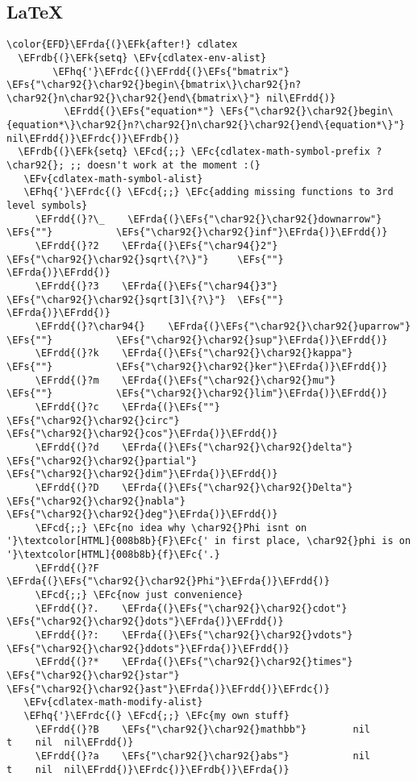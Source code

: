 \documentclass{article}
\newcommand{\EFc}[1]{\textcolor{EFc}{#1}} %
\newcommand{\EFcd}[1]{\textcolor{EFcd}{#1}} %
\newcommand{\EFs}[1]{\textcolor{EFs}{#1}} %
\newcommand{\EFk}[1]{\textcolor{EFk}{#1}} %
\newcommand{\EFv}[1]{\textcolor{EFv}{#1}} %
\newcommand{\EFhq}[1]{#1} %
\newcommand{\EFrda}[1]{\textcolor{EFrda}{#1}} %
\newcommand{\EFrdb}[1]{\textcolor{EFrdb}{#1}} %
\newcommand{\EFrdc}[1]{\textcolor{EFrdc}{#1}} %
\newcommand{\EFrdd}[1]{\textcolor{EFrdd}{#1}} %
\begin{document}
\subsection{\LaTeX{}}
\label{sec:org824c76c}
\begin{Code}
\begin{Verbatim}
\color{EFD}\EFrda{(}\EFk{after!} cdlatex
  \EFrdb{(}\EFk{setq} \EFv{cdlatex-env-alist}
        \EFhq{'}\EFrdc{(}\EFrdd{(}\EFs{"bmatrix"} \EFs{"\char92{}\char92{}begin\{bmatrix\}\char92{}n?\char92{}n\char92{}\char92{}end\{bmatrix\}"} nil\EFrdd{)}
          \EFrdd{(}\EFs{"equation*"} \EFs{"\char92{}\char92{}begin\{equation*\}\char92{}n?\char92{}n\char92{}\char92{}end\{equation*\}"} nil\EFrdd{)}\EFrdc{)}\EFrdb{)}
  \EFrdb{(}\EFk{setq} \EFcd{;;} \EFc{cdlatex-math-symbol-prefix ?\char92{}; ;; doesn't work at the moment :(}
   \EFv{cdlatex-math-symbol-alist}
   \EFhq{'}\EFrdc{(} \EFcd{;;} \EFc{adding missing functions to 3rd level symbols}
     \EFrdd{(}?\_    \EFrda{(}\EFs{"\char92{}\char92{}downarrow"}  \EFs{""}           \EFs{"\char92{}\char92{}inf"}\EFrda{)}\EFrdd{)}
     \EFrdd{(}?2    \EFrda{(}\EFs{"\char94{}2"}           \EFs{"\char92{}\char92{}sqrt\{?\}"}     \EFs{""}     \EFrda{)}\EFrdd{)}
     \EFrdd{(}?3    \EFrda{(}\EFs{"\char94{}3"}           \EFs{"\char92{}\char92{}sqrt[3]\{?\}"}  \EFs{""}     \EFrda{)}\EFrdd{)}
     \EFrdd{(}?\char94{}    \EFrda{(}\EFs{"\char92{}\char92{}uparrow"}    \EFs{""}           \EFs{"\char92{}\char92{}sup"}\EFrda{)}\EFrdd{)}
     \EFrdd{(}?k    \EFrda{(}\EFs{"\char92{}\char92{}kappa"}      \EFs{""}           \EFs{"\char92{}\char92{}ker"}\EFrda{)}\EFrdd{)}
     \EFrdd{(}?m    \EFrda{(}\EFs{"\char92{}\char92{}mu"}         \EFs{""}           \EFs{"\char92{}\char92{}lim"}\EFrda{)}\EFrdd{)}
     \EFrdd{(}?c    \EFrda{(}\EFs{""}             \EFs{"\char92{}\char92{}circ"}     \EFs{"\char92{}\char92{}cos"}\EFrda{)}\EFrdd{)}
     \EFrdd{(}?d    \EFrda{(}\EFs{"\char92{}\char92{}delta"}      \EFs{"\char92{}\char92{}partial"}  \EFs{"\char92{}\char92{}dim"}\EFrda{)}\EFrdd{)}
     \EFrdd{(}?D    \EFrda{(}\EFs{"\char92{}\char92{}Delta"}      \EFs{"\char92{}\char92{}nabla"}    \EFs{"\char92{}\char92{}deg"}\EFrda{)}\EFrdd{)}
     \EFcd{;;} \EFc{no idea why \char92{}Phi isnt on '}\textcolor[HTML]{008b8b}{F}\EFc{' in first place, \char92{}phi is on '}\textcolor[HTML]{008b8b}{f}\EFc{'.}
     \EFrdd{(}?F    \EFrda{(}\EFs{"\char92{}\char92{}Phi"}\EFrda{)}\EFrdd{)}
     \EFcd{;;} \EFc{now just convenience}
     \EFrdd{(}?.    \EFrda{(}\EFs{"\char92{}\char92{}cdot"} \EFs{"\char92{}\char92{}dots"}\EFrda{)}\EFrdd{)}
     \EFrdd{(}?:    \EFrda{(}\EFs{"\char92{}\char92{}vdots"} \EFs{"\char92{}\char92{}ddots"}\EFrda{)}\EFrdd{)}
     \EFrdd{(}?*    \EFrda{(}\EFs{"\char92{}\char92{}times"} \EFs{"\char92{}\char92{}star"} \EFs{"\char92{}\char92{}ast"}\EFrda{)}\EFrdd{)}\EFrdc{)}
   \EFv{cdlatex-math-modify-alist}
   \EFhq{'}\EFrdc{(} \EFcd{;;} \EFc{my own stuff}
     \EFrdd{(}?B    \EFs{"\char92{}\char92{}mathbb"}        nil          t    nil  nil\EFrdd{)}
     \EFrdd{(}?a    \EFs{"\char92{}\char92{}abs"}           nil          t    nil  nil\EFrdd{)}\EFrdc{)}\EFrdb{)}\EFrda{)}
\end{Verbatim}
\end{Code}
\end{document}
